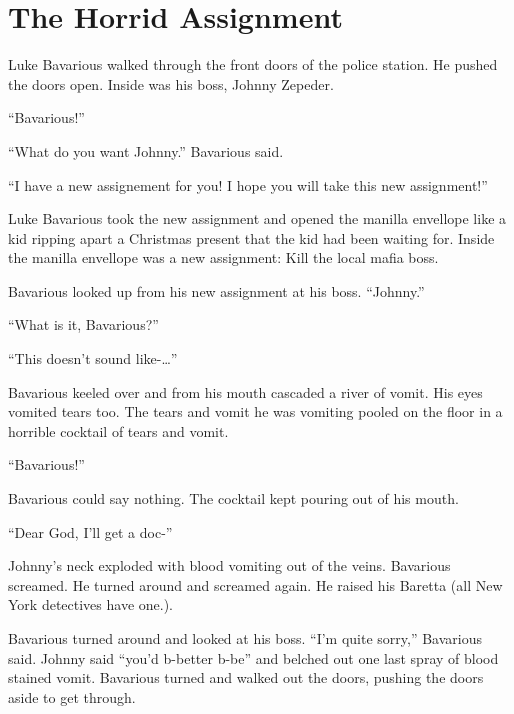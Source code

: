  



\chapter{The Horrid Assignment}





Luke Bavarious walked through the front doors of the police
station. He pushed the doors open. Inside was his boss, Johnny
Zepeder.



``Bavarious!''

``What do you want Johnny.'' Bavarious said.

``I have a new assignement for you! I hope you will take this new
assignment!''



Luke Bavarious took the new assignment and opened the manilla
envellope like a kid ripping apart a Christmas present that the kid
had been waiting for. Inside the manilla envellope was a new
assignment: Kill the local mafia boss.



Bavarious looked up from his new assignment at his boss.
``Johnny.''



``What is it, Bavarious?''

``This doesn't sound like-{\ldots}''



Bavarious keeled over and from his mouth cascaded a river of vomit.
His eyes vomited tears too. The tears and vomit he was vomiting
pooled on the floor in a horrible cocktail of tears and
vomit.



``Bavarious!''



Bavarious could say nothing. The cocktail kept pouring out of his
mouth.



``Dear God, I'll get a doc-''



Johnny's neck exploded with blood vomiting out of the veins.
Bavarious screamed. He turned around and screamed again. He raised
his Baretta (all New York detectives have one.).



Bavarious turned around and looked at his boss. ``I'm quite sorry,''
Bavarious said. Johnny said ``you'd b-better b-be'' and belched out
one last spray of blood stained vomit. Bavarious turned and walked
out the doors, pushing the doors aside to get through.



